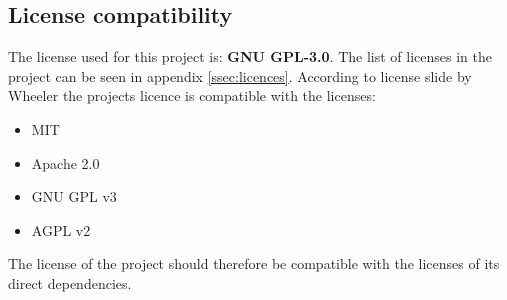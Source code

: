 \subsection{License compatibility}
The license used for this project is: \textbf{GNU GPL-3.0}. The list of licenses in the project can be seen in appendix \ref{ssec:licences}. According to license slide by Wheeler\cite{LicenseComp} the projects licence is compatible with the licenses: 
\begin{itemize}
    \item MIT
    \item Apache 2.0
    \item GNU GPL v3
    \item AGPL v2 
\end{itemize}
The license of the project should therefore be compatible with the licenses of its direct dependencies.

